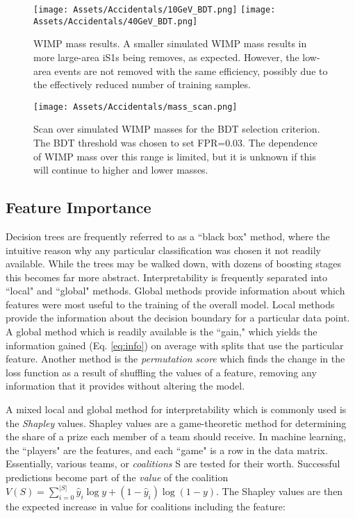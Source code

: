 \begin{figure}
    \centering
    \texttt{[image: Assets/Accidentals/10GeV\_BDT.png]}
    \texttt{[image: Assets/Accidentals/40GeV\_BDT.png]}
    \caption[WIMP mass results. A smaller simulated WIMP mass results in more large-area iS1s being removes, as expected.]%
    {WIMP mass results. A smaller simulated WIMP mass results in more large-area iS1s being removes, as expected.
    However, the low-area events are not removed with the same efficiency, possibly due to the effectively reduced number of training samples.}
    \label{fig:wimp_bdt}
\end{figure}
\begin{figure}
    \centering
    \texttt{[image: Assets/Accidentals/mass\_scan.png]}
    \caption[Scan over simulated WIMP masses for the BDT selection criterion.]%
    {Scan over simulated WIMP masses for the BDT selection criterion. 
    The BDT threshold was chosen to set FPR=0.03.
    The dependence of WIMP mass over this range is limited, but it is unknown if this will continue to higher and lower masses.}
    \label{fig:bdt_mass_scan}
\end{figure}


\subsection{Feature Importance}

Decision trees are frequently referred to as a ``black box" method, where the intuitive reason why any particular classification was chosen it not readily available.
While the trees may be walked down, with dozens of boosting stages this becomes far more abstract.
Interpretability is frequently separated into ``local" and ``global" methods.
Global methods provide information about which features were most useful to the training of the overall model.
Local methods provide the information about the decision boundary for a particular data point.
A global method which is readily available is the ``gain," which yields the information gained (Eq. \ref{eq:info}) on average with splits that use the particular feature.
Another method is the \textit{permutation score} which finds the change in the loss function as a result of shuffling the values of a feature, removing any information that it provides without altering the model.


A mixed local and global method for interpretability which is commonly used is the \textit{Shapley} values\cite{strumbelj_explaining_2014}.
Shapley values are a game-theoretic method for determining the share of a prize each member of a team should receive.
In machine learning, the ``players" are the features, and each ``game" is a row in the data matrix.
Essentially, various teams, or \textit{coalitions} S are tested for their worth.
Successful predictions become part of the \textit{value} of the coalition  $V(S)= \sum_{i=0}^{|S|} \hat{y}_i \log y + (1-\hat{y}_i )\log (1-y)$.
The Shapley values are then the expected increase in value for coalitions including the feature:

